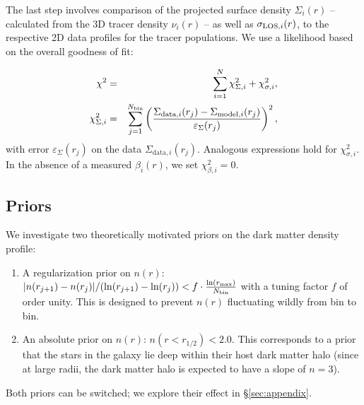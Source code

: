 

The last step involves comparison of the projected surface density $\Sigma_i(r)$
-- calculated from the 3D tracer density $\nu_i(r)$ -- as well as $\sigma_{{\rm
    LOS},i}(r)$, to the respective 2D data profiles for the tracer
populations. We use a likelihood based on the overall goodness of fit:

\begin{eqnarray}
    \chi^2 &=& \sum_{i=1}^N \chi_{\Sigma,i}^2 + \chi_{\sigma,i}^2,\\
    \chi_{\Sigma,i}^2 &=& \sum_{j=1}^{N_{\rm bin}} \left(\frac{\Sigma_{\text{data},i}(r_j)-\Sigma_{\text{model},i}(r_j)}{\varepsilon_\Sigma(r_j)}\right)^2,
\end{eqnarray}
with error $\varepsilon_\Sigma(r_j)$ on the data
$\Sigma_{\text{data},i}(r_j)$. Analogous expressions hold for
$\chi_{\sigma,i}^2$. In the absence of a
measured $\beta_i(r)$, we set $\chi_{\beta,i}^2=0$.

\subsection{Priors}

We investigate two theoretically motivated priors on the dark matter density
profile:

\begin{enumerate}
    \item A regularization prior on $n(r)$:
    $|n(r_{j+1})-n(r_{j})|/(\ln(r_{j+1})-\ln(r_{j}))<f\cdot\frac{\ln(r_{\rm
        max})}{N_{\rm bin}}$ with a tuning factor $f$ of order
    unity. This is designed to prevent $n(r)$ fluctuating wildly from bin to bin.

    \item An absolute prior on $n(r)$: $n(r<r_{1/2})<2.0$. This corresponds to a
    prior that the stars in the galaxy lie deep within their host dark matter
    halo (since at large radii, the dark matter halo is expected to have a slope
    of $n = 3$).
\end{enumerate}
Both priors can be switched; we explore their effect in \S\ref{sec:appendix}.

